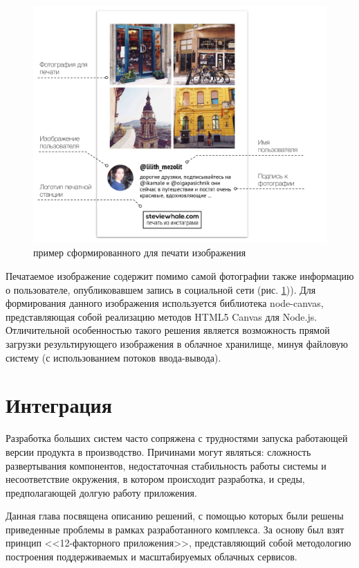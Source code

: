 \documentclass[a4paper,14pt,href,draft]{article}
\begin{document}
\begin{figure}[htbp]
\begin{center}
  \includegraphics[scale=0.65]{photo-layout.pdf}
    \caption{пример сформированного для печати изображения}
    \label{fig:PhotoLayout}
\end{center}
\end{figure}

Печатаемое изображение содержит помимо самой фотографии также информацию о пользователе, опубликовавшем запись
в социальной сети (рис. \ref{fig:PhotoLayout})). Для формирования данного изображения используется библиотека node-canvas,
представляющая собой реализацию методов HTML5 Canvas для Node.js. Отличительной особенностью такого решения является
возможность прямой загрузки результирующего изображения в облачное хранилище, минуя файловую систему (с использованием
потоков ввода-вывода).

\section{Интеграция}
Разработка больших систем часто сопряжена с трудностями запуска работающей версии продукта в производство. Причинами могут
являться: сложность развертывания компонентов, недостаточная стабильность работы системы и несоответствие окружения, в
котором происходит разработка, и среды, предполагающей долгую работу приложения.

Данная глава посвящена описанию решений, с помощью которых были решены приведенные проблемы в рамках разработанного
комплекса. За основу был взят принцип <<12-факторного приложения>>\cite{TwelveFactor}, представляющий собой методологию
построения поддерживаемых и масштабируемых облачных сервисов.
\end{document}
